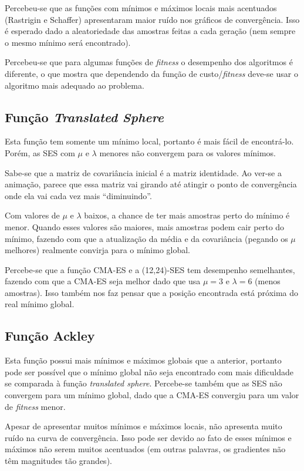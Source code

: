 \documentclass[brazil, 12pt]{article}
\begin{document}
Percebeu-se que as funções com mínimos e máximos locais mais acentuados (Rastrigin e Schaffer) apresentaram maior ruído nos gráficos de convergência. Isso é esperado dado a aleatoriedade das amostras feitas a cada geração (nem sempre o mesmo mínimo será encontrado).

Percebeu-se que para algumas funções de \textit{fitness} o desempenho dos algoritmos é diferente, o que mostra que dependendo da função de custo/\textit{fitness} deve-se usar o algoritmo mais adequado ao problema.

\subsection{Função \textit{Translated Sphere}}
Esta função tem somente um mínimo local, portanto é mais fácil de encontrá-lo. Porém, as SES com $\mu$ e $\lambda$ menores não convergem para os valores mínimos.

Sabe-se que a matriz de covariância inicial é a matriz identidade. Ao ver-se a animação, parece que essa matriz vai girando até atingir o ponto de convergência onde ela vai cada vez mais ``diminuindo''.

Com valores de $\mu$ e $\lambda$ baixos, a chance de ter mais amostras perto do mínimo é menor. Quando esses valores são maiores, mais amostras podem cair perto do mínimo, fazendo com que a atualização da média e da covariância (pegando os $\mu$ melhores) realmente convirja para o mínimo global.

Percebe-se que a função CMA-ES e a (12,24)-SES tem desempenho semelhantes, fazendo com que a CMA-ES seja melhor dado que usa $\mu=3$ e $\lambda=6$ (menos amostras). Isso também nos faz pensar que a posição encontrada está próxima do real mínimo global.

\subsection{Função Ackley}
Esta função possui mais mínimos e máximos globais que a anterior, portanto pode ser possível que o mínimo global não seja encontrado com mais dificuldade se comparada à função \textit{ translated sphere}. Percebe-se também que as SES não convergem para um mínimo global, dado que a CMA-ES convergiu para um valor de \textit{fitness} menor.

Apesar de apresentar muitos mínimos e máximos locais, não apresenta muito ruído na curva de convergência. Isso pode ser devido ao fato de esses mínimos e máximos não serem muitos acentuados (em outras palavras, os gradientes não têm magnitudes tão grandes).
\end{document}

